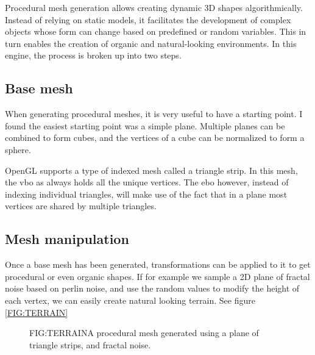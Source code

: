 
\label{SEC:PROCEDURAL}


Procedural mesh generation allows creating dynamic 3D shapes algorithmically.
Instead of relying on static models,
it facilitates the development of complex objects whose form can change based on predefined or random variables.
This in turn enables the creation of organic and natural-looking environments.
In this engine,
the process is broken up into two steps.

\subsection{Base mesh}

When generating procedural meshes,
it is very useful to have a starting point.
I found the easiest starting point was a simple plane.
Multiple planes can be combined to form cubes,
and the vertices of a cube can be normalized to form a sphere.

OpenGL supports a type of indexed mesh called a triangle strip.
In this mesh,
the \ac{vbo} as always holds all the unique vertices.
The \ac{ebo} however,
instead of indexing individual triangles,
will make use of the fact that in a plane most vertices are shared by multiple triangles.

\subsection{Mesh manipulation}

Once a base mesh has been generated,
transformations can be applied to it to get procedural or even organic shapes.
If for example we sample a 2D plane of fractal noise based on perlin noise,
and use the random values to modify the height of each vertex,
we can easily create natural looking terrain.
See figure \ref{FIG:TERRAIN}

\begin{figure}[Procedural terrain mesh]{FIG:TERRAIN}{A procedural mesh generated using a plane of triangle strips, and fractal noise.}
\end{figure}


